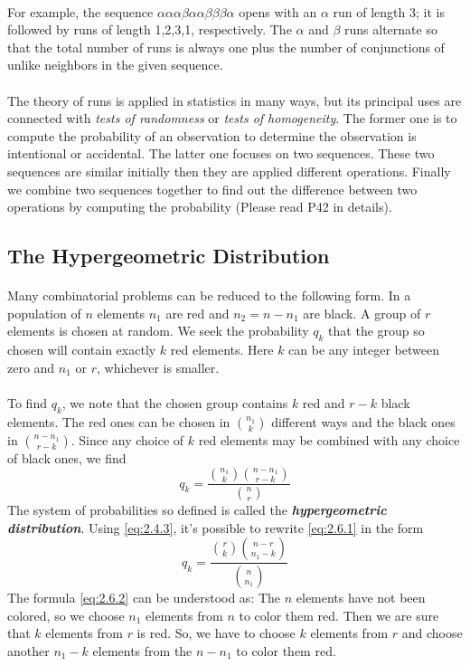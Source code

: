 \documentclass{article}
\numberwithin{equation}{subsection}
\begin{document}
			\paragraph{} For example, the sequence $\alpha\alpha\alpha\beta\alpha\alpha\beta\beta\beta\alpha$ opens with an $\alpha$ run of length 3; it is followed by runs of length 1,2,3,1, respectively. The $\alpha$ and $\beta$ runs alternate so that the total number of runs is always one plus the number of conjunctions of unlike neighbors in the given sequence.
			\paragraph{} The theory of runs is applied in statistics in many ways, but its principal uses are connected with \textit{tests of randomness} or \textit{tests of homogeneity}. The former one is to compute the probability of an observation to determine the observation is intentional or accidental. The latter one focuses on two sequences. These two sequences are similar initially then they are applied different operations. Finally we combine two sequences together to find out the difference between two operations by computing the probability (Please read P42 in details).
		\subsection{The Hypergeometric Distribution}
			\paragraph{} Many combinatorial problems can be reduced to the following form. In a population of $n$ elements $n_1$ are red and $n_2=n-n_1$ are black. A group of $r$ elements is chosen at random. We seek the probability $q_k$ that the group so chosen will contain exactly $k$ red elements. Here $k$ can be any integer between zero and $n_1$ or $r$, whichever is smaller.
			\paragraph{} To find $q_k$, we note that the chosen group contains $k$ red and $r-k$ black elements. The red ones can be chosen in ${n_1 \choose k}$ different ways and the black ones in ${n-n_1 \choose r-k}$. Since any choice of $k$ red elements may be combined with any choice of black ones, we find
			\begin{equation}
				\label{eq:2.6.1}
				q_k = \frac{{n_1\choose k}{n-n_1 \choose r-k}}{{n \choose r}}
			\end{equation}
			The system of probabilities so defined is called the \textbf{\textit{hypergeometric distribution}}. Using \eqref{eq:2.4.3}, it's possible to rewrite \eqref{eq:2.6.1} in the form
			\begin{equation}
				\label{eq:2.6.2}
				q_k = \frac{{r \choose k}{n-r \choose n_1-k}}{{n \choose n_1}}
			\end{equation}
			The formula \eqref{eq:2.6.2} can be understood as: The $n$ elements have not been colored, so we choose $n_1$ elements from $n$ to color them red. Then we are sure that $k$ elements from $r$ is red. So, we have to choose $k$ elements from $r$ and choose another $n_1-k$ elements from the $n-n_1$ to color them red.
\end{document}
